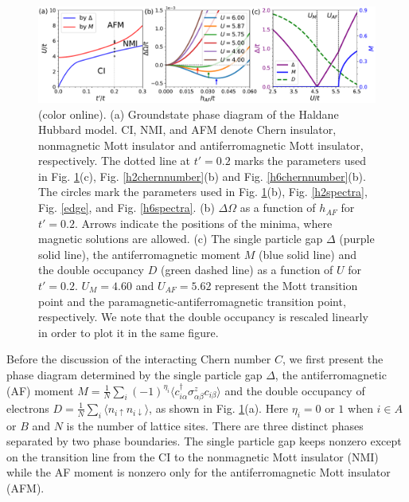 \documentclass[12pt]{iopart}
\begin{document}
\begin{figure}
\centering
\includegraphics[scale=0.45]{phase}
\caption{(color online). (a) Groundstate phase diagram of the Haldane Hubbard model. CI, NMI, and AFM denote Chern insulator, nonmagnetic Mott insulator and antiferromagnetic Mott insulator, respectively. The dotted line at $t'=0.2$ marks the parameters used in Fig. \ref{phase}(c), Fig. \ref{h2chernnumber}(b) and Fig. \ref{h6chernnumber}(b). The circles mark the parameters used in Fig. \ref{phase}(b), Fig. \ref{h2spectra}, Fig. \ref{edge}, and Fig. \ref{h6spectra}. (b) $\Delta\Omega$ as a function of $h_{AF}$ for $t'=0.2$. Arrows indicate the positions of the minima, where magnetic solutions are allowed. (c) The single particle gap $\Delta$ (purple solid line), the antiferromagnetic moment $M$ (blue solid line) and the double occupancy $D$ (green dashed line) as a function of $U$ for $t'=0.2$. $U_M=4.60$ and $U_{AF}=5.62$ represent the Mott transition point and the paramagnetic-antiferromagnetic transition point, respectively. We note that the double occupancy is rescaled linearly in order to plot it in the same figure.} \label{phase}
\end{figure}

\par Before the discussion of the interacting Chern number $C$, we first present the phase diagram determined by the single particle gap $\Delta$, the antiferromagnetic (AF) moment $M=\frac{1}{N}\sum_i(-1)^{\eta_i}\langle c^\dagger_{i\alpha}\sigma^z_{\alpha\beta}c_{i\beta}\rangle$ and the double occupancy of electrons $D=\frac{1}{N}\sum_i\langle n_{i\uparrow}n_{i\downarrow}\rangle$, as shown in Fig. \ref{phase}(a). Here $\eta_i=0$ or $1$ when $i\in A$ or $B$ and $N$ is the number of lattice sites. There are three distinct phases separated by two phase boundaries. The single particle gap keeps nonzero except on the transition line from the CI to the nonmagnetic Mott insulator (NMI) while the AF moment is nonzero only for the antiferromagnetic Mott insulator (AFM).
\end{document}
